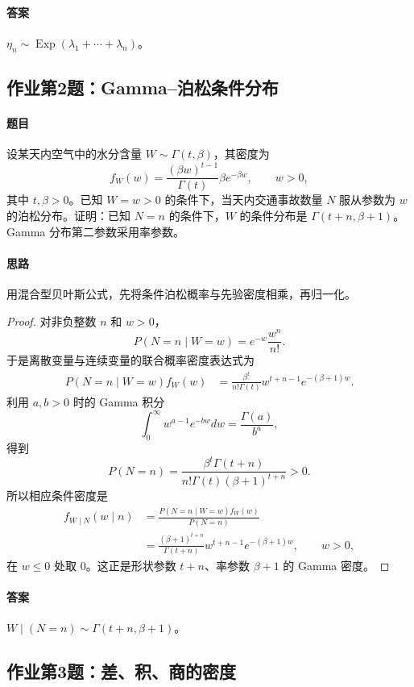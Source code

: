 \paragraph{答案}$\eta_n\sim\operatorname{Exp}(\lambda_1+\cdots+\lambda_n)$。

\subsection{作业第2题：Gamma--泊松条件分布}\label{ex:w12-h2}
\paragraph{题目}
设某天内空气中的水分含量 $W\sim\Gamma(t,\beta)$，其密度为
\[
f_W(w)=\frac{(\beta w)^{t-1}}{\Gamma(t)}\beta e^{-\beta w},\qquad w>0,
\]
其中 $t,\beta>0$。已知 $W=w>0$ 的条件下，当天内交通事故数量 $N$ 服从参数为 $w$ 的泊松分布。证明：已知 $N=n$ 的条件下，$W$ 的条件分布是 $\Gamma(t+n,\beta+1)$。Gamma 分布第二参数采用率参数。
\paragraph{思路}用混合型贝叶斯公式，先将条件泊松概率与先验密度相乘，再归一化。
\begin{proof}
对非负整数 $n$ 和 $w>0$，
\[
P(N=n\mid W=w)=e^{-w}\frac{w^n}{n!}.
\]
于是离散变量与连续变量的联合概率密度表达式为
\begin{align*}
P(N=n\mid W=w)f_W(w)
&=\frac{\beta^t}{n!\Gamma(t)}w^{t+n-1}e^{-(\beta+1)w}.
\end{align*}
利用 $a,b>0$ 时的 Gamma 积分
\[
\int_0^\infty w^{a-1}e^{-bw}dw=\frac{\Gamma(a)}{b^a},
\]
得到
\[
P(N=n)=\frac{\beta^t\Gamma(t+n)}{n!\Gamma(t)(\beta+1)^{t+n}}>0.
\]
所以相应条件密度是
\begin{align*}
f_{W\mid N}(w\mid n)
&=\frac{P(N=n\mid W=w)f_W(w)}{P(N=n)}\\
&=\frac{(\beta+1)^{t+n}}{\Gamma(t+n)}
w^{t+n-1}e^{-(\beta+1)w},\qquad w>0,
\end{align*}
在 $w\leq0$ 处取 $0$。这正是形状参数 $t+n$、率参数 $\beta+1$ 的 Gamma 密度。
\end{proof}
\paragraph{答案}$W\mid(N=n)\sim\Gamma(t+n,\beta+1)$。

\subsection{作业第3题：差、积、商的密度}\label{ex:w12-h3}
